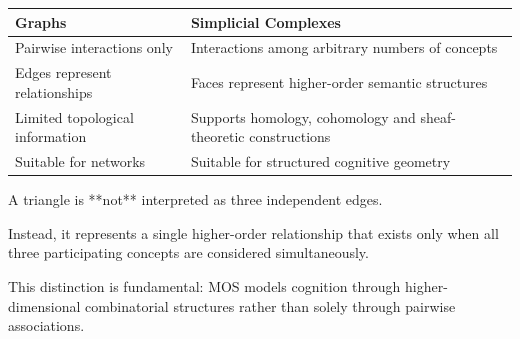
\begin{highlightbox}


\BodyFont

\begin{center}

\begin{tabular}{p{6.5cm}|p{8.5cm}}

\textbf{Graphs}

&
\textbf{Simplicial Complexes}

\\
\hline

Pairwise interactions only

&

Interactions among arbitrary numbers of concepts

\\[3mm]

Edges represent relationships

&

Faces represent higher-order semantic structures

\\[3mm]

Limited topological information

&

Supports homology, cohomology and sheaf-theoretic constructions

\\[3mm]

Suitable for networks

&

Suitable for structured cognitive geometry

\end{tabular}

\end{center}

\end{highlightbox}


\begin{remarkbox}

\BodyFont

A triangle is **not** interpreted as three independent edges.

Instead, it represents a single higher-order relationship that exists only
when all three participating concepts are considered simultaneously.

This distinction is fundamental: MOS models cognition through
higher-dimensional combinatorial structures rather than solely through
pairwise associations.

\end{remarkbox}

